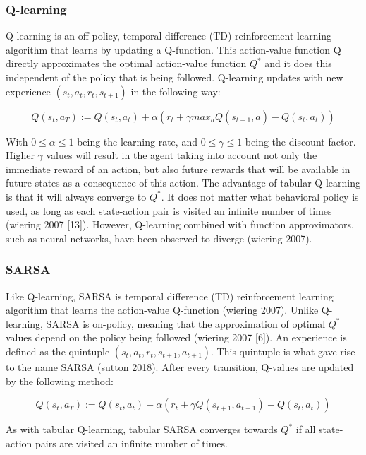 \hypertarget{q-learning}{%
\subsubsection{Q-learning}\label{q-learning}}

Q-learning is an off-policy, temporal difference (TD) reinforcement
learning algorithm that learns by updating a Q-function. This
action-value function Q directly approximates the optimal action-value
function \(Q^*\) and it does this independent of the policy that is
being followed. Q-learning updates with new experience
\((s_t, a_t, r_t, s_{t+1})\) in the following way:

\[Q(s_t,a_T) := Q(s_t,a_t) + \alpha ( r_t + \gamma max_a Q(s_{t+1}, a) - Q(s_t,a_t) )\]

With \(0 \leq \alpha \leq 1\) being the learning rate, and
\(0 \leq \gamma \leq 1\) being the discount factor. Higher \(\gamma\)
values will result in the agent taking into account not only the
immediate reward of an action, but also future rewards that will be
available in future states as a consequence of this action. The
advantage of tabular Q-learning is that it will always converge to
\(Q^*\). It does not matter what behavioral policy is used, as long as
each state-action pair is visited an infinite number of times (wiering
2007 {[}13{]}). However, Q-learning combined with function
approximators, such as neural networks, have been observed to diverge
(wiering 2007).

\hypertarget{sarsa}{%
\subsubsection{SARSA}\label{sarsa}}

Like Q-learning, SARSA is temporal difference (TD) reinforcement
learning algorithm that learns the action-value Q-function (wiering
2007). Unlike Q-learning, SARSA is on-policy, meaning that the
approximation of optimal \(Q^*\) values depend on the policy being
followed (wiering 2007 {[}6{]}). An experience is defined as the
quintuple \((s_t, a_t, r_t, s_{t+1}, a_{t+1})\). This quintuple is what
gave rise to the name SARSA (sutton 2018). After every transition,
Q-values are updated by the following method:

\[Q(s_t,a_T) := Q(s_t,a_t) + \alpha ( r_t + \gamma Q(s_{t+1}, a_{t+1}) - Q(s_t,a_t) )\]

As with tabular Q-learning, tabular SARSA converges towards \(Q^*\) if
all state-action pairs are visited an infinite number of times.


